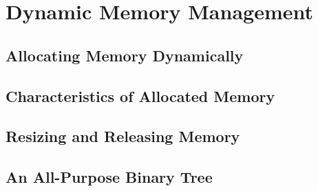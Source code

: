 \section{Dynamic Memory Management}

\subsection{Allocating Memory Dynamically}
\subsection{Characteristics of Allocated Memory}
\subsection{Resizing and Releasing Memory}
\subsection{An All-Purpose Binary Tree}